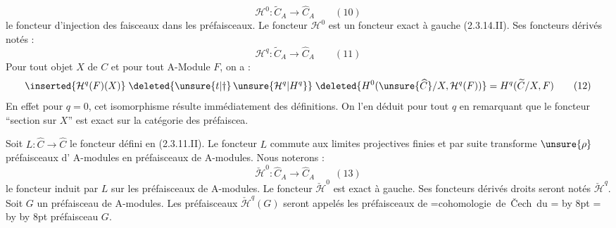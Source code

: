 \[
\mathcal H^0:\widetilde C_A\longrightarrow\widehat C_A \qquad(10)
\]
le foncteur d'injection des faisceaux dans les préfaisceaux.
Le foncteur $\mathcal H^0$ est un foncteur exact à gauche (2.3.14.II).
Ses foncteurs dérivés  notés :
\[
\mathcal H^q:\widetilde C_A\longrightarrow\widehat C_A \qquad(11)
\]
Pour tout objet $X$ de $C$  et pour tout A-Module $F$, on a :
\[
\inserted{\mathcal H^q(F)(X)}\;\deleted{\unsure{t|\dagger}\,\unsure{\mathcal H^q|H^q}}\;
\deleted{H^0(\unsure{\widehat C}/X,\mathcal H^q(F))}=H^q(\widetilde C/X,F)\qquad(12)
\]
En effet pour $q=0$, cet isomorphisme résulte immédiatement des définitions. On l'en déduit pour tout $q$ en remarquant que le foncteur ``section sur $X$'' est exact  sur la catégorie des préfaiscea.

Soit $L:\widehat C\longrightarrow\widehat C$ le foncteur défini en (2.3.11.II).
Le foncteur $L$ commute aux limites projectives finies et par suite transforme  $\unsure{\rho}$ préfaisceaux d' A-modules en préfaisceaux de A-modules. Nous noterons :
\[
\check{\mathcal H}^{0}:\widehat C_A\longrightarrow\widehat C_A \qquad(13)
\]
le foncteur induit par $L$ sur les préfaisceaux de A-modules.
Le foncteur $\check{\mathcal H}^0$ est exact à  gauche. Ses foncteurs dérivés droits seront notés $\check{\mathcal H}^q$.  Soit $G$ un préfaisceau de A-modules. Les préfaisceaux $\check{\mathcal H}^q(G)$ seront appelés les préfaisceaux de \begingroup
{}=\hbox{cohomologie de \v{C}ech du}
= \advance{} by 8pt
= \advance{} by  \advance{} by 8pt
\leavevmode{}%
\kern4pt\kern4pt\endgroup préfaisceau $G$.


